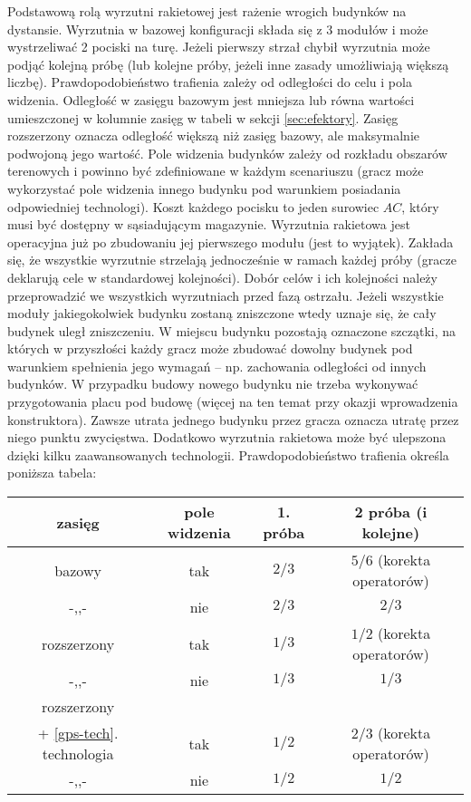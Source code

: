 \documentclass[11pt,a4paper]{article}
\begin{document}
Podstawową rolą wyrzutni rakietowej jest rażenie wrogich budynków na dystansie. Wyrzutnia w bazowej konfiguracji składa się z 3 modułów i może wystrzeliwać 2 pociski na turę. Jeżeli pierwszy strzał chybił wyrzutnia może podjąć kolejną próbę (lub kolejne próby, jeżeli inne zasady umożliwiają większą liczbę). Prawdopodobieństwo trafienia zależy od odległości do celu i pola widzenia. Odległość w zasięgu bazowym jest mniejsza lub równa wartości umieszczonej w kolumnie zasięg w tabeli w sekcji \ref{sec:efektory}. Zasięg rozszerzony oznacza odległość większą niż zasięg bazowy, ale maksymalnie podwojoną jego wartość. Pole widzenia budynków zależy od rozkładu obszarów terenowych i powinno być zdefiniowane w każdym scenariuszu (gracz może wykorzystać pole widzenia innego budynku pod warunkiem posiadania odpowiedniej technologi). Koszt każdego pocisku to jeden surowiec $AC$, który musi być dostępny w sąsiadującym magazynie. Wyrzutnia rakietowa jest operacyjna już po zbudowaniu jej pierwszego modułu (jest to wyjątek). Zakłada się, że wszystkie wyrzutnie strzelają jednocześnie w ramach każdej próby (gracze deklarują cele w standardowej kolejności). Dobór celów i ich kolejności należy przeprowadzić we wszystkich wyrzutniach przed fazą ostrzału. Jeżeli wszystkie moduły jakiegokolwiek budynku zostaną zniszczone wtedy uznaje się, że cały budynek uległ zniszczeniu. W miejscu budynku pozostają oznaczone szczątki, na których w przyszłości każdy gracz może zbudować dowolny budynek pod warunkiem spełnienia jego wymagań -- np. zachowania odległości od innych budynków. W przypadku budowy nowego budynku nie trzeba wykonywać przygotowania placu pod budowę (więcej na ten temat przy okazji wprowadzenia konstruktora). Zawsze utrata jednego budynku przez gracza oznacza utratę przez niego punktu zwycięstwa. Dodatkowo wyrzutnia rakietowa może być ulepszona dzięki kilku zaawansowanych technologii. Prawdopodobieństwo trafienia określa poniższa tabela:
\begin{center}
\begin{tabular}{| c | c | c | c |}
  \hline
   \textbf{zasięg} & \textbf{pole widzenia} & \textbf{1. próba} & \textbf{2 próba} (i kolejne) \\
  \hline
  bazowy & tak   & $2/3$ & $5/6$ (korekta operatorów) \\  
  \hline
  -,,- & nie   & $2/3$ & $2/3$ \\  
  \hline
  rozszerzony & tak & $1/3$ & $1/2$ (korekta operatorów) \\  
  \hline
  -,,- & nie  & $1/3$ & $1/3$ \\  
  \hline
  rozszerzony  &  &  &  \\  
  + \ref{gps-tech}. technologia & tak  & $1/2$ & $2/3$ (korekta operatorów) \\  
  \hline
  -,,- & nie   & $1/2$ & $1/2$ \\  
  \hline
\end{tabular}
\end{center}
\end{document}
